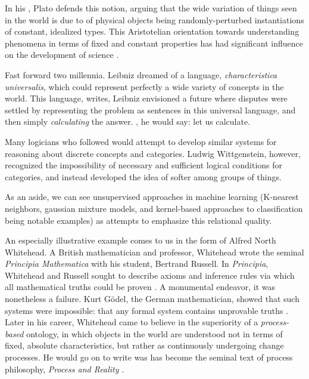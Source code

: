 In his , Plato defends this notion, arguing that the wide variation of things seen in the world is due to of physical objects being randomly-perturbed instantiations of constant, idealized types.
This Aristotelian orientation towards understanding phenomena in terms of fixed and constant properties has had significant influence on the development of science \citep{pirsig}.

\bigskip

Fast forward two millennia.
Leibniz dreamed of a language, \textit{characteristica universalis}, which could represent perfectly a wide variety of concepts in the world.
This language, \citet{couturat} writes, 
Leibniz envisioned a future where disputes were settled by representing the problem as sentences in this universal language, and then simply \textit{calculating} the answer.
, he would say: let us calculate.

Many logicians who followed would attempt to develop similar systems for reasoning about discrete concepts and categories.
Ludwig Wittgenstein, however, recognized the impossibility of necessary and sufficient logical conditions for categories, and instead developed the idea of softer  among groups of things.

As an aside, we can see unsupervised approaches in machine learning (K-nearest neighbors, gaussian mixture models, and kernel-based approaches to classification being notable examples) as attempts to emphasize this relational quality.

\bigskip

An especially illustrative example comes to us in the form of Alfred North Whitehead.
A British mathematician and professor, Whitehead wrote the seminal \textit{Principia Mathematica} with his student, Bertrand Russell.
In \textit{Principia}, Whitehead and Russell sought to describe axioms and inference rules via which all mathematical truths could be proven \citep{doxiadis}.
A monumental endeavor, it was nonetheless a failure.
Kurt G{\"o}del, the German mathematician, showed that such systems were impossible: that any formal system contains unprovable truths \citep{hofstadter}.
Later in his career, Whitehead came to believe in the superiority of a \textit{process-based} ontology, in which objects in the world are understood not in terms of fixed, absolute characteristics, but rather as continuously undergoing change processes.
He would go on to write was has become the seminal text of process philosophy, \textit{Process and Reality} \citep{whitehead}.

